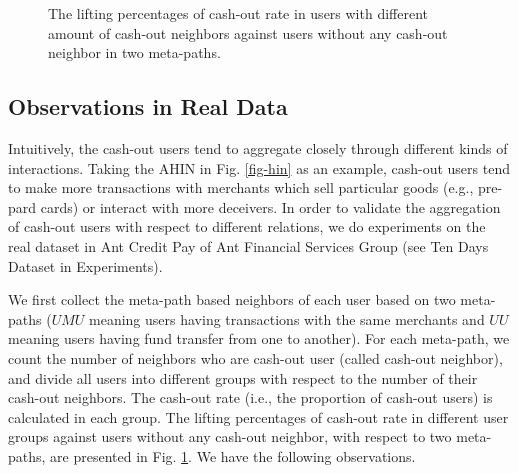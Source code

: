 \begin{figure}[t]
\centering
{}
\caption{The lifting percentages of cash-out rate in users with different amount of cash-out neighbors against users without any cash-out neighbor in two meta-paths.}%
\label{fig:network_analysis}
\end{figure}

\subsection{Observations in Real Data}
Intuitively, the cash-out users tend to aggregate closely through different kinds of interactions.
Taking the AHIN in Fig. \ref{fig-hin} as an example, cash-out users tend to make more transactions with merchants which sell particular goods (e.g., pre-pard cards) or interact with more deceivers. 
In order to validate the aggregation of cash-out users with respect to different relations, we do experiments on the real dataset in Ant Credit Pay of Ant Financial Services Group (see Ten Days Dataset in Experiments). 

We first collect the meta-path based neighbors of each user based on two meta-paths ($UMU$ meaning users having transactions with the same merchants and $UU$ meaning users having fund transfer from one to another). 
For each meta-path, we count the number of neighbors who are cash-out user (called cash-out neighbor), and divide all users into different groups with respect to the number of their cash-out neighbors.
The cash-out rate (i.e., the proportion of cash-out users) is calculated in each group. The lifting percentages of cash-out rate in different user groups against users without any cash-out neighbor, with respect to two meta-paths, are presented in Fig. \ref{fig:network_analysis}. 
We have the following observations.

